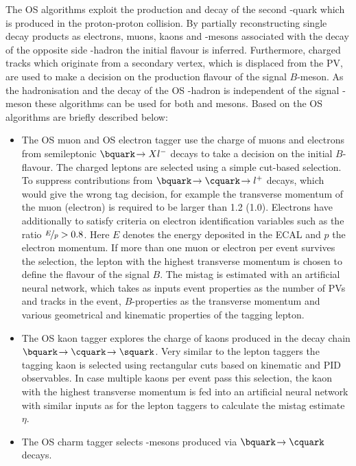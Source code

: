 The OS algorithms exploit the production and decay of the second \bquark-quark which is produced in the proton-proton collision.
By partially reconstructing single decay products as electrons, muons, kaons and \D-mesons associated with the decay of the opposite side \bquark-hadron the initial flavour is inferred.
Furthermore, charged tracks which originate from a secondary vertex, which is displaced from the \ac{PV}, are used to make a decision on the production flavour of the signal $B$-meson.
As the hadronisation and the decay of the OS \bquark-hadron is independent of the signal \B-meson these algorithms can be used for both \Bz and \Bs mesons. Based on \cite{LHCb-PAPER-2011-027, LHCb-PAPER-2015-027} the OS algorithms are briefly described below:
\begin{itemize}
    \item The OS muon and OS electron tagger use the charge of muons and electrons from semileptonic $\bquark\!\to Xl^-$ decays to take a decision on the initial $B$-flavour.
    The charged leptons are selected using a simple cut-based selection.
    To suppress contributions from $\bquark\!\to\cquark\!\to l^+$ decays, which would give the wrong tag decision, for example the transverse momentum of the muon (electron) is required to be larger than \SI[per-mode=symbol]{1.2}{\GeVc} (\SI[per-mode=symbol]{1.0}{\GeVc}).
    Electrons have additionally to satisfy criteria on electron identification variables such as the ratio $\nicefrac{E}{p}>0.8$.
    Here $E$ denotes the energy deposited in the ECAL and $p$ the electron momentum.
    If more than one muon or electron per event survives the selection, the lepton with the highest transverse momentum is chosen to define the flavour of the signal $B$.
    The mistag is estimated with an artificial neural network, which takes as inputs event properties as the number of \ac{PV}s and tracks in the event, $B$-properties as the transverse momentum and various geometrical and kinematic properties of the tagging lepton.
    \item The OS kaon tagger explores the charge of kaons produced in the decay chain $\bquark\!\to\cquark\!\to\squark$.
    Very similar to the lepton taggers the tagging kaon is selected using rectangular cuts based on kinematic and PID observables.
    In case multiple kaons per event pass this selection, the kaon with the highest transverse momentum is fed into an artificial neural network with similar inputs as for the lepton taggers to calculate the mistag estimate $\eta$.
    \item The OS charm tagger selects \D-mesons produced via $\bquark\!\to\cquark$ decays.

\end{itemize}
